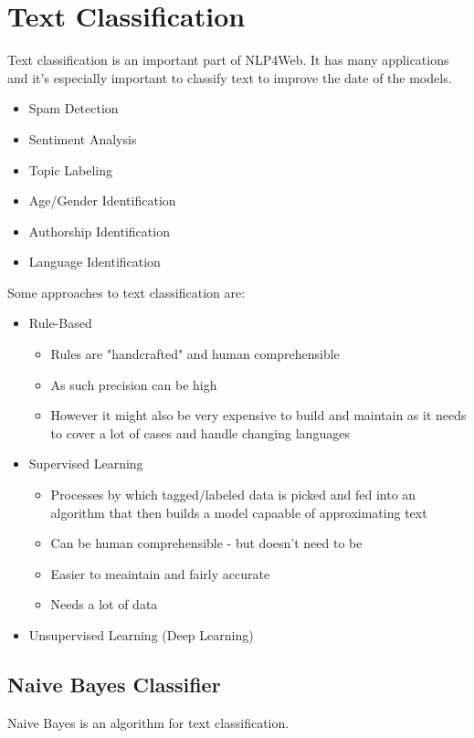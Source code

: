 \documentclass[
../../NLP4W_Summary.tex,
]
{subfiles}
\begin{document}
\section{Text Classification}
Text classification is an important part of NLP4Web. It has many applications and it's especially important to classify text to improve the date of the models.

\begin{greenbox}
    \begin{itemize}
        \item Spam Detection
        \item Sentiment Analysis
        \item Topic Labeling
        \item Age/Gender Identification
        \item Authorship Identification
        \item Language Identification
    \end{itemize}
\end{greenbox}

Some approaches to text classification are:

\begin{greenbox}
    \begin{itemize}
        \item Rule-Based
        \begin{itemize}
            \item Rules are "handcrafted" and human comprehensible
            \item As such precision can be high
            \item However it might also be very expensive to build and maintain as it needs to cover a lot of cases and handle changing languages
        \end{itemize}
        \item Supervised Learning
        \begin{itemize}
            \item Processes by which tagged/labeled data is picked and fed into an algorithm that then builds a model capaable of approximating text
            \item Can be human comprehensible - but doesn't need to be
            \item Easier to meaintain and fairly accurate
            \item Needs a lot of data
        \end{itemize}
        \item Unsupervised Learning (Deep Learning)
    \end{itemize}
\end{greenbox}

\subsection{Naive Bayes Classifier}
Naive Bayes is an algorithm for text classification.
\end{document}
